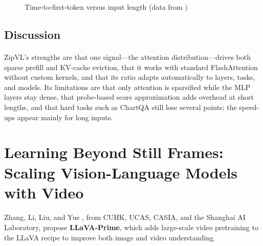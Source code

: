 \documentclass[12pt,a4paper,final]{extreport}
\begin{document}
\begin{figure}[htbp]
\centering
{}
\caption{Time-to-first-token versus input length (data from \cite{p3})}
\label{fig:p3_ttft}
\end{figure}

\subsection{Discussion}

\paragraph{} ZipVL's strengths are that one signal---the attention distribution---drives both sparse prefill and KV-cache eviction, that it works with standard FlashAttention without custom kernels, and that its ratio adapts automatically to layers, tasks, and models. Its limitations are that only attention is sparsified while the MLP layers stay dense, that probe-based score approximation adds overhead at short lengths, and that hard tasks such as ChartQA still lose several points; the speed-ups appear mainly for long inputs.

\section{Learning Beyond Still Frames: Scaling Vision-Language Models with Video}

\paragraph{} Zhang, Li, Liu, and Yue \cite{p4}, from CUHK, UCAS, CASIA, and the Shanghai AI Laboratory, propose \textbf{LLaVA-Prime}, which adds large-scale video pretraining to the LLaVA recipe to improve both image and video understanding.
\end{document}
